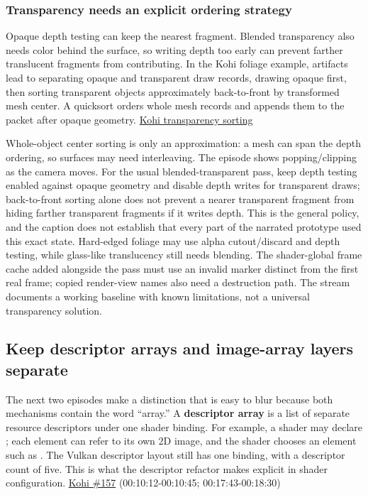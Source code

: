 \subsubsection{Transparency needs an explicit ordering strategy}\label{06-engine-ii-ch025-transparency-needs-an-explicit-ordering-strategy}

\hypertarget{06-engine-ii-ch025-transparency-needs-an-explicit-ordering-strategy}{}

Opaque depth testing can keep the nearest fragment. Blended transparency also needs color behind the surface, so writing depth too early can prevent farther translucent fragments from contributing. In the Kohi foliage example, artifacts lead to separating opaque and transparent draw records, drawing opaque first, then sorting transparent objects approximately back-to-front by transformed mesh center. A quicksort orders whole mesh records and appends them to the packet after opaque geometry. \href{https://www.youtube.com/watch?v=duQSUgdrBk0}{Kohi transparency sorting}

Whole-object center sorting is only an approximation: a mesh can span the depth ordering, so surfaces may need interleaving. The episode shows popping/clipping as the camera moves. For the usual blended-transparent pass, keep depth testing enabled against opaque geometry and disable depth writes for transparent draws; back-to-front sorting alone does not prevent a nearer transparent fragment from hiding farther transparent fragments if it writes depth. This is the general policy, and the caption does not establish that every part of the narrated prototype used this exact state. Hard-edged foliage may use alpha cutout/discard and depth testing, while glass-like translucency still needs blending. The shader-global frame cache added alongside the pass must use an invalid marker distinct from the first real frame; copied render-view names also need a destruction path. The stream documents a working baseline with known limitations, not a universal transparency solution.

\subsection{Keep descriptor arrays and image-array layers separate}\label{06-engine-ii-ch025-keep-descriptor-arrays-and-image-array-layers-separate}

\hypertarget{06-engine-ii-ch025-keep-descriptor-arrays-and-image-array-layers-separate}{}

The next two episodes make a distinction that is easy to blur because both mechanisms contain the word ``array.'' A \textbf{descriptor array} is a list of separate resource descriptors under one shader binding. For example, a shader may declare ; each element can refer to its own 2D image, and the shader chooses an element such as . The Vulkan descriptor layout still has one binding, with a descriptor count of five. This is what the descriptor refactor makes explicit in shader configuration. \href{https://www.youtube.com/watch?v=ZmZUmsqUN6Q}{Kohi \#157} (00:10:12-00:10:45; 00:17:43-00:18:30)


